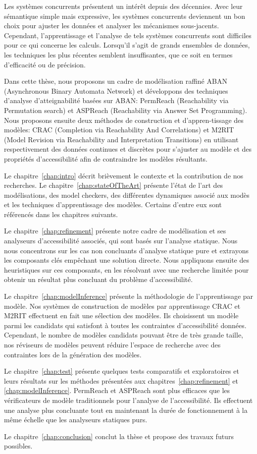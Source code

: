 Les systèmes concurrents présentent un intérêt depuis des décennies. Avec leur sémantique simple mais expressive, les systèmes concurrents deviennent un bon choix pour ajuster les données et analyser les mécanismes sous-jacents. Cependant, l'apprentissage et l'analyse de tels systèmes concurrents sont difficiles pour ce qui concerne les calculs. Lorsqu'il s'agit de grands ensembles de données, les techniques les plus récentes semblent insuffisantes, que ce soit en termes d'efficacité ou de précision.

Dans cette thèse, nous proposons un cadre de modélisation raffiné ABAN (Asynchronous Binary Automata Network) et développons des techniques d'analyse d'atteignabilité basées sur ABAN: PermReach (Reachability via Permutation search) et ASPReach (Reachability via Answer Set Programming). Nous proposons ensuite deux méthodes de construction et d'appren-tissage des modèles: CRAC (Completion via Reachability And Correlations) et M2RIT (Model Revision via Reachability and Interpretation Transitions) en utilisant respectivement des données continues et discrètes pour s'ajuster au modèle et des propriétés d'accessibilité afin de contraindre les modèles résultants.

Le chapitre~\ref{chap:intro} décrit brièvement le contexte et la contribution de nos recherches. Le chapitre~\ref{chap:stateOfTheArt} présente l'état de l'art des modélisations, des model checkers, des différentes dynamiques associé aux modès et les techniques d'apprentissage des modèles. Certains d'entre eux sont référencés dans les chapitres suivants.

Le chapitre~\ref{chap:refinement} présente notre cadre de modélisation et ses analyseurs d'accessibilité associés, qui sont basés sur l'analyse statique. Nous nous concentrons sur les cas non concluants d'analyse statique pure et extrayons les composants clés empêchant une solution directe. Nous appliquons ensuite des heuristiques sur ces composants, en les résolvant avec une recherche limitée pour obtenir un résultat plus concluant du problème d'accessibilité.

Le chapitre~\ref{chap:modelInference} présente la méthodologie de l'apprentissage par modèle. Nos systèmes de construction de modèles par apprentissage CRAC et M2RIT effectuent en fait une sélection des modèles. Ils choisissent un modèle parmi les candidats qui satisfont à toutes les contraintes d'accessibilité données. Cependant, le nombre de modèles candidats pouvant être de très grande taille, nos réviseurs de modèles peuvent réduire l'espace de recherche avec des contraintes lors de la génération des modèles.

Le chapitre~\ref{chap:test} présente quelques tests comparatifs et exploratoires et leurs résultats sur les méthodes présentées aux chapitres~\ref{chap:refinement} et \ref{chap:modelInference}. PermReach et ASPReach sont plus efficaces que les vérificateurs de modèle traditionnels pour l'analyse de l'accessibilité. Ils effectuent une analyse plus concluante tout en maintenant la durée de fonctionnement à la même échelle que les analyseurs statiques purs.

Le chapitre~\ref{chap:conclusion} conclut la thèse et propose des travaux futurs possibles.